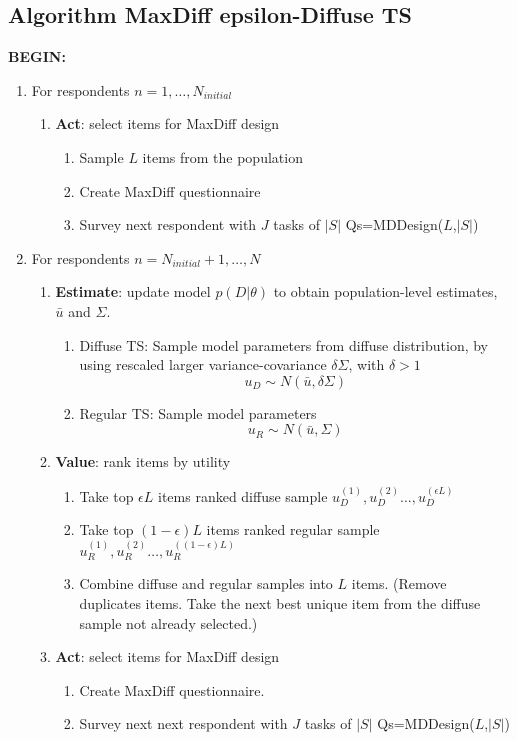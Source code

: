 \documentclass[nonblindrev]{informs3}
\begin{document}
\subsection{Algorithm MaxDiff epsilon-Diffuse TS}

\textbf{BEGIN:}
	\begin{enumerate}
		\item   For respondents $n =1,\ldots,N_{initial}$
		\begin{enumerate}
			\item \textbf{Act}: select items for MaxDiff design
			\begin{enumerate}
				\item Sample $L$ items from the population 
				\item Create MaxDiff questionnaire 
				\item Survey next respondent with $J$ tasks of $|S|$ Qs=MDDesign($L$,$|S|$)
			\end{enumerate}
		\end{enumerate}
		\item For respondents $n = N_{initial} + 1,\ldots, N$
		\begin{enumerate}
			\item \textbf{Estimate}: update model $p(D|\theta)$ to obtain population-level estimates, $\bar{u}$ and $\Sigma$.
			\begin{enumerate}
				\item Diffuse TS: Sample model parameters from diffuse distribution, by using rescaled larger variance-covariance $\delta \Sigma$, with $\delta > 1$ \[ u_D \sim N(\bar{u},\delta \Sigma)\]
				\item Regular TS: Sample model parameters \[u_R \sim N(\bar{u},\Sigma)\]
			\end{enumerate}
			\item \textbf{Value}: rank items by utility
			\begin{enumerate}
				\item Take top $\epsilon L$ items ranked diffuse sample $u_D^{(1)},u_D^{(2)}\ldots,u_D^{(\epsilon L)}$
				\item Take top $(1-\epsilon)L$ items ranked regular sample $u_R^{(1)},u_R^{(2)}\ldots,u_R^{((1-\epsilon)L)}$
				\item Combine diffuse and regular samples into $L$ items. (Remove duplicates items. Take the next best unique item from the diffuse sample not already selected.)
			\end{enumerate}
			\item \textbf{Act}: select items for MaxDiff design
			\begin{enumerate}
				\item Create MaxDiff questionnaire.
				\item Survey next next respondent with $J$ tasks of $|S|$ Qs=MDDesign($L$,$|S|$)
			\end{enumerate}
		\end{enumerate}
	\end{enumerate}
\end{document}
